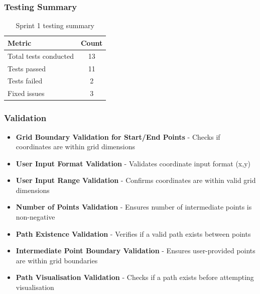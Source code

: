 \subsubsection{Testing Summary}
\begin{table}[htbp]
\centering
\begin{tabular}{|l|c|}
\hline
\textbf{Metric} & \textbf{Count} \\
\hline
Total tests conducted & 13 \\
\hline
Tests passed & 11 \\
\hline
Tests failed & 2 \\
\hline
Fixed issues & 3 \\
\hline
\end{tabular}
\caption{Sprint 1 testing summary}
\end{table}

\subsubsection{Validation}
    \begin{itemize}
    \item \textbf{Grid Boundary Validation for Start/End Points} - Checks if coordinates are within grid dimensions
    \item \textbf{User Input Format Validation} - Validates coordinate input format (x,y)
    \item \textbf{User Input Range Validation} - Confirms coordinates are within valid grid dimensions
    \item \textbf{Number of Points Validation} - Ensures number of intermediate points is non-negative
    \item \textbf{Path Existence Validation} - Verifies if a valid path exists between points
    \item \textbf{Intermediate Point Boundary Validation} - Ensures user-provided points are within grid boundaries
    \item \textbf{Path Visualisation Validation} - Checks if a path exists before attempting visualisation
\end{itemize}

